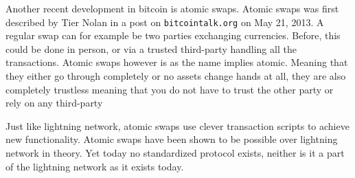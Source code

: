 
Another recent development in bitcoin is atomic swaps. Atomic swaps was first described by Tier Nolan in a post on
\texttt{bitcointalk.org} on May 21, 2013.\cite{tier_nolan}
A regular swap can for example be two parties exchanging currencies. Before,
this could be done in person, or via a trusted third-party handling all the
transactions. Atomic swaps however is as the name implies atomic. Meaning that
they either go through completely or no assets change hands at all, they are
also completely trustless meaning that you do not have to trust the
other party or rely on any third-party

Just like lightning network, atomic swaps use clever transaction scripts to
achieve new functionality. Atomic swaps have been shown to be possible over
lightning network in theory. Yet today no standardized protocol exists, neither is it a part of the lightning network as it exists today.
